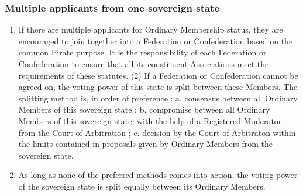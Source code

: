 \begin{frame}

\frametitle{Multiple applicants from one sovereign state}
\label{multipleapplicantsfromonesovereignstate}

\begin{enumerate}
\item If there are multiple applicants for Ordinary Membership status, they are encouraged to join together into a Federation or Confederation based on the common Pirate purpose. It is the responsibility of each Federation or Confederation to ensure that all its constituent Associations meet the requirements of these statutes. (2) If a Federation or Confederation cannot be agreed on, the voting power of this state is split between these Members. The splitting method is, in order of preference :
 a. consensus between all Ordinary Members of this sovereign state ;
 b. compromise between all Ordinary Members of this sovereign state, with the help of a Registered Moderator from the Court of Arbitration ;
 c. decision by the Court of Arbitraton within the limits contained in proposals given by Ordinary Members from the sovereign state.

\item As long as none of the preferred methods comes into action, the voting power of the sovereign state is split equally between its Ordinary Members.

\end{enumerate}

\end{frame}

